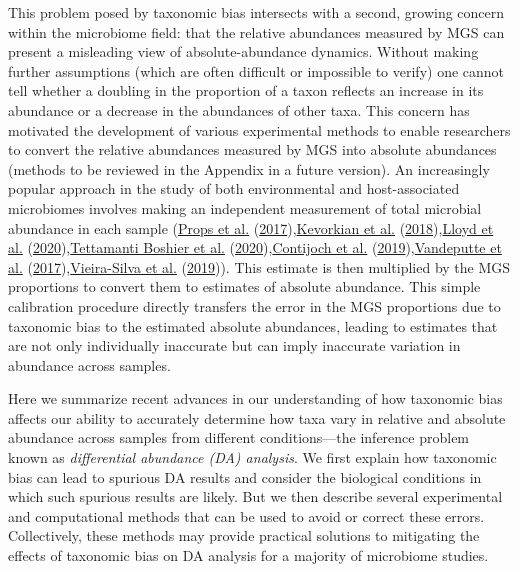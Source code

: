 \documentclass[
]{article}
\theoremstyle{definition}
\theoremstyle{definition}
\theoremstyle{definition}
\theoremstyle{definition}
\theoremstyle{remark}
\begin{document}
This problem posed by taxonomic bias intersects with a second, growing concern within the microbiome field: that the relative abundances measured by MGS can present a misleading view of absolute-abundance dynamics.
Without making further assumptions (which are often difficult or impossible to verify) one cannot tell whether a doubling in the proportion of a taxon reflects an increase in its abundance or a decrease in the abundances of other taxa.
This concern has motivated the development of various experimental methods to enable researchers to convert the relative abundances measured by MGS into absolute abundances (methods to be reviewed in the Appendix in a future version).
An increasingly popular approach in the study of both environmental and host-associated microbiomes involves making an independent measurement of total microbial abundance in each sample (\protect\hyperlink{ref-props2017abso}{Props et al.} (\protect\hyperlink{ref-props2017abso}{2017}),\protect\hyperlink{ref-kevorkian2018esti}{Kevorkian et al.} (\protect\hyperlink{ref-kevorkian2018esti}{2018}),\protect\hyperlink{ref-lloyd2020evid}{Lloyd et al.} (\protect\hyperlink{ref-lloyd2020evid}{2020}),\protect\hyperlink{ref-tettamantiboshier2020comp}{Tettamanti Boshier et al.} (\protect\hyperlink{ref-tettamantiboshier2020comp}{2020}),\protect\hyperlink{ref-contijoch2019gutm}{Contijoch et al.} (\protect\hyperlink{ref-contijoch2019gutm}{2019}),\protect\hyperlink{ref-vandeputte2017quan}{Vandeputte et al.} (\protect\hyperlink{ref-vandeputte2017quan}{2017}),\protect\hyperlink{ref-vieirasilva2019quan}{Vieira-Silva et al.} (\protect\hyperlink{ref-vieirasilva2019quan}{2019})).
This estimate is then multiplied by the MGS proportions to convert them to estimates of absolute abundance.
This simple calibration procedure directly transfers the error in the MGS proportions due to taxonomic bias to the estimated absolute abundances, leading to estimates that are not only individually inaccurate but can imply inaccurate variation in abundance across samples.

Here we summarize recent advances in our understanding of how taxonomic bias affects our ability to accurately determine how taxa vary in relative and absolute abundance across samples from different conditions---the inference problem known as \emph{differential abundance (DA) analysis}.
We first explain how taxonomic bias can lead to spurious DA results and consider the biological conditions in which such spurious results are likely.
But we then describe several experimental and computational methods that can be used to avoid or correct these errors.
Collectively, these methods may provide practical solutions to mitigating the effects of taxonomic bias on DA analysis for a majority of microbiome studies.
\end{document}
